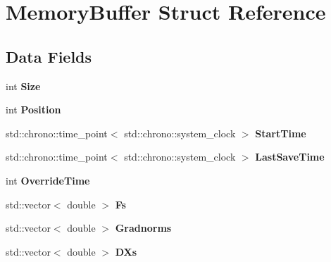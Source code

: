 \hypertarget{structMemoryBuffer}{}\section{Memory\+Buffer Struct Reference}
\label{structMemoryBuffer}
\subsection*{Data Fields}
\begin{DoxyCompactItemize}
\item 
\mbox{\label{structMemoryBuffer_a9dd45cbef6dc3a2b739930e4dec409d3}} 
int {\bfseries Size}
\item 
\mbox{\label{structMemoryBuffer_a86585015fa99011516592b628f70db83}} 
int {\bfseries Position}
\item 
\mbox{\label{structMemoryBuffer_a4e662ae94caa8b785bd7275b895cc8fb}} 
std\+::chrono\+::time\+\_\+point$<$ std\+::chrono\+::system\+\_\+clock $>$ {\bfseries Start\+Time}
\item 
\mbox{\label{structMemoryBuffer_ad72781d6a1db3dfbf6c81596c8a07f00}} 
std\+::chrono\+::time\+\_\+point$<$ std\+::chrono\+::system\+\_\+clock $>$ {\bfseries Last\+Save\+Time}
\item 
\mbox{\label{structMemoryBuffer_a3398f730a3eb1ae6c93b3e7df134522a}} 
int {\bfseries Override\+Time}
\item 
\mbox{\label{structMemoryBuffer_ab047fd7f062b4db7bd4cdfff7bdaf62c}} 
std\+::vector$<$ double $>$ {\bfseries Fs}
\item 
\mbox{\label{structMemoryBuffer_a130230435c568e4d3af8fc2bd3223293}} 
std\+::vector$<$ double $>$ {\bfseries Gradnorms}
\item 
\mbox{\label{structMemoryBuffer_a99afdaad76269c41ed13560ff1fdafb7}} 
std\+::vector$<$ double $>$ {\bfseries D\+Xs}
\item 
\mbox{\label{structMemoryBuffer_a966ec2eb4f30c5b27bddccb16b6e1c1b}} 

\end{DoxyCompactItemize}
